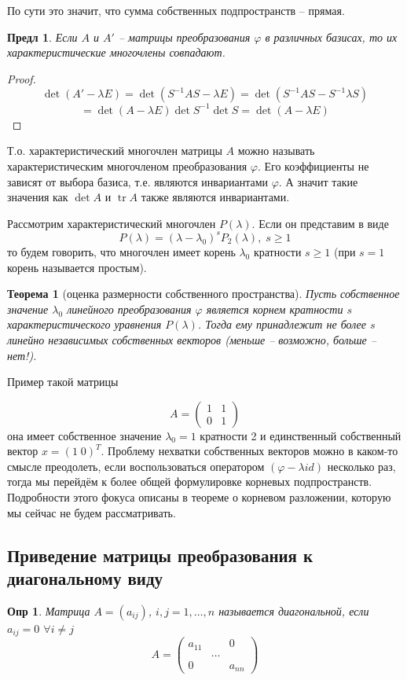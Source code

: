 \documentclass[a4paper,12pt]{article}
\DeclareMathOperator{\tr}{\mathop{tr}}
\newtheorem*{definition}{Опр}
\newtheorem{theorem}{Теорема}[section]
\newtheorem{propos}{Предл}[section]
\begin{document}
По сути это значит, что сумма собственных подпространств -- прямая.

\begin{propos}
	Если $A$ и $A'$ -- матрицы преобразования $\varphi$ в различных базисах, то их характеристические многочлены совпадают.
\end{propos}
\begin{proof}
	\[ 
		\det (A' - \lambda E) = \det(S^{-1} A S - \lambda E) = \det(S^{-1} A S - S^{-1} \lambda S)
	\]
	\[
	  	= \det(A - \lambda E) \det S^{-1} \det S = \det(A - \lambda E)
	\]
	 
\end{proof}

Т.о. характеристический многочлен матрицы $A$ можно называть характеристическим многочленом преобразования $\varphi$. Его коэффициенты не зависят от выбора базиса, т.е. являются инвариантами $\varphi$. А значит такие значения как $\det A$ и $\tr A$ также являются инвариантами.

Рассмотрим характеристический многочлен $P(\lambda)$. Если он представим в виде
\[
	P(\lambda) = (\lambda - \lambda_0)^s P_2(\lambda), \; s \ge 1
\]
то будем говорить, что многочлен имеет корень $\lambda_0$ кратности $s \ge 1$ (при $s = 1$ корень называется простым).

\begin{theorem}[оценка размерности собственного пространства]
	Пусть собственное значение $\lambda_0$ линейного преобразования $\varphi$ является корнем кратности $s$ характеристического уравнения $P(\lambda)$. Тогда ему принадлежит не более $s$ линейно независимых собственных векторов (меньше -- возможно, больше -- нет!).
\end{theorem}

Пример такой матрицы

\[
	A = \begin{pmatrix}
		1 & 1 \\
		0 & 1 
	\end{pmatrix}
\]
она имеет собственное значение $\lambda_0 = 1$ кратности 2 и единственный собственный вектор $x = (1 \; 0)^T$. Проблему нехватки собственных векторов можно в каком-то смысле преодолеть, если воспользоваться оператором $(\varphi - \lambda id)$ несколько раз, тогда мы перейдём к более общей формулировке корневых подпространств. Подробности этого фокуса описаны в теореме о корневом разложении, которую мы сейчас не будем рассматривать.

\subsection{Приведение матрицы преобразования к диагональному виду}
\begin{definition}
Матрица $A = (a_{ij})$, $i,j = 1,\ldots,n$ называется диагональной, если $a_{ij} = 0$ $\forall i \ne j$
\[
	A = \begin{pmatrix}
		a_{11} & 	    & 0 \\
		       & \ldots &   \\
		0      &        & a_{nn}
	\end{pmatrix}
\]
\end{definition}
\end{document}
